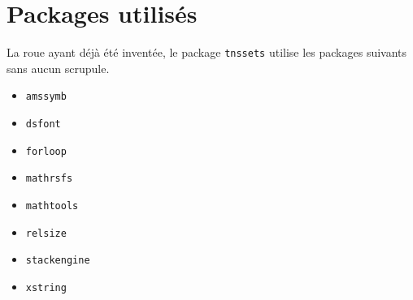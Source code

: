 \documentclass[12pt,a4paper]{article}
\begin{document}
\section{Packages utilisés}

La roue ayant déjà été inventée, le package \verb#tnssets# utilise les packages suivants sans aucun scrupule.

\begin{multicols}{4}
    \begin{itemize}
        \item \verb#amssymb#
        \item \verb#dsfont#
        \item \verb#forloop#
        \item \verb#mathrsfs#
        \item \verb#mathtools#
        \item \verb#relsize#
        \item \verb#stackengine#
        \item \verb#xstring#
    \end{itemize}
\end{multicols}
\end{document}
